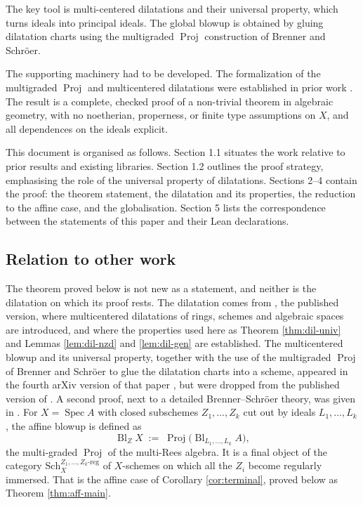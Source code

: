 \documentclass[pdflatex,sn-mathphys-num]{sn-jnl}
\theoremstyle{plain}
\theoremstyle{definition}
\newcommand{\Spec}{\operatorname{Spec}}
\newcommand{\Proj}{\operatorname{Proj}}
\newcommand{\Bl}{\operatorname{Bl}}
\begin{document}
The key tool is multi-centered dilatations and their universal property, which turns ideals into principal ideals. The global blowup is
obtained by gluing dilatation charts using the multigraded $\Proj$ construction of
Brenner and Schröer.

The supporting machinery had to be developed. The formalization of the multigraded $\Proj$ and multicentered dilatations were established in prior work \cite{mayeux-zhang,mayeux-zhang-short}. The result is a complete, checked proof of
a non-trivial theorem in algebraic geometry, with no noetherian, properness, or finite
type assumptions on $X$, and all dependences on the ideals explicit.

This document is organised as follows. Section 1.1 situates the work relative to prior
results and existing libraries. Section 1.2 outlines the proof strategy, emphasising the
role of the universal property of dilatations. Sections 2--4 contain the proof: the theorem
statement, the dilatation and its properties, the reduction to the affine case, and
the globalisation. Section 5 lists the correspondence between the statements
of this paper and their Lean declarations.

\subsection{Relation to other work}\label{sec:relation}

The theorem proved below is not new as a statement, and neither is the
dilatation on which its proof rests. The dilatation comes from
\cite{mayeux-dilatations}, the published version, where multicentered
dilatations of rings, schemes and algebraic spaces are introduced, and where
the properties used here as Theorem \ref{thm:dil-univ} and Lemmas
\ref{lem:dil-nzd} and \ref{lem:dil-gen} are established. The multicentered
blowup and its universal property, together with the use of the multigraded
$\Proj$ of Brenner and Schr\"oer \cite{brenner-schroer} to glue the dilatation
charts into a scheme, appeared in the fourth arXiv version of that paper
\cite{mayeux-dilatations-v4}, but were dropped from the published version of
\cite{mayeux-dilatations}. A second proof, next to a detailed Brenner–Schröer
theory, was given in \cite{mayeux-riche}. For $X = \Spec A$ with closed subschemes $Z_1, \dots, Z_k$ cut out by ideals
$L_1, \dots, L_k$, the affine blowup is defined as
\[
  \Bl_Z X \;:=\; \Proj\bigl( \Bl_{L_1, \dots, L_k} A \bigr),
\]
the multi-graded $\Proj$ of the multi-Rees algebra. It is a final object of the category
$\mathrm{Sch}_X^{Z_1, \dots, Z_k\text{-reg}}$ of $X$-schemes on which all the
$Z_i$ become regularly immersed. That is the affine case of Corollary
\ref{cor:terminal}, proved below as Theorem \ref{thm:aff-main}.
\end{document}
